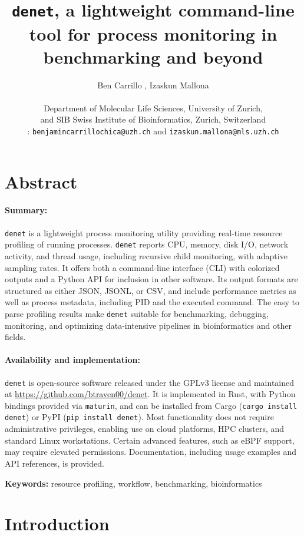 \documentclass[10pt]{article}
\title{\texttt{denet}, a lightweight command-line tool for process monitoring in benchmarking and beyond}
\author{Ben Carrillo \orcidlink{0009-0003-5704-4151}, Izaskun Mallona \orcidlink{0000-0002-2853-7526}\\
\\
Department of Molecular Life Sciences, University of Zurich,\\
and SIB Swiss Institute of Bioinformatics, Zurich, Switzerland \\ 
{ \Letter: \texttt{benjamincarrillochica@uzh.ch} and \texttt{izaskun.mallona@mls.uzh.ch}}
}
\date{}
\begin{document}
\maketitle
	
\section*{Abstract} %

\paragraph{Summary:} \texttt{denet} is a lightweight process monitoring utility providing real-time resource profiling of running processes. \texttt{denet} reports CPU, memory, disk I/O, network activity, and thread usage, including recursive child monitoring, with adaptive sampling rates. It offers both a command-line interface (CLI) with colorized outputs and a Python API for inclusion in other software. Its output formats are structured as either JSON, JSONL, or CSV, and include performance metrics as well as process metadata, including PID and the executed command. The easy to parse profiling results make \texttt{denet} suitable for benchmarking, debugging, monitoring, and optimizing data-intensive pipelines in bioinformatics and other fields. 

\paragraph{Availability and implementation:} \texttt{denet} is open-source software released under the GPLv3 license and maintained at \url{https://github.com/btraven00/denet}. It is implemented in Rust, with Python bindings provided via \texttt{maturin}, and can be installed from Cargo (\texttt{cargo install denet}) or PyPI (\texttt{pip install denet}). Most functionality does not require administrative privileges, enabling use on cloud platforms, HPC clusters, and standard Linux workstations. Certain advanced features, such as eBPF support, may require elevated permissions. Documentation, including usage examples and API references, is provided.

\vspace{0.5cm}

\noindent\textbf{Keywords:} resource profiling, workflow, benchmarking, bioinformatics

\section*{Introduction}  %
\label{sec:intro}
\end{document}
